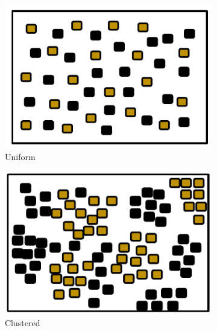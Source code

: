 \begin{figure} [h]
        \centering
        \begin{subfigure}[b]{0.21\textwidth}
                \includegraphics[width=\textwidth]{chapters/chapter4/figures/uniformenv.pdf}
                \caption{Uniform}
                \label{fig:uniformenv}
        \end{subfigure}%
        \begin{subfigure}[b]{0.205\textwidth}
                \includegraphics[width=\textwidth]{chapters/chapter4/figures/clusterenv.pdf}
                \caption{Clustered}
                \label{fig:clusterenv}
        \end{subfigure}
        \begin{subfigure}[b]{0.2\textwidth}

\end{subfigure}
\end{figure}
